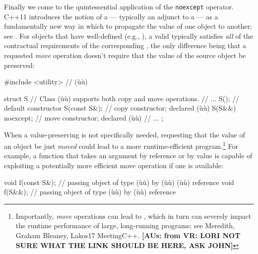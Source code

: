 Finally we come to the quintessential application of the
\lstinline!noexcept! operator. C++11 introduces the notion of a
 --- typically an adjunct to a  --- as a fundamentally new way in which to propagate the
value of one object to another; see . For objects that have well-defined  (e.g., ), a valid  typically satisfies \emph{all} of the contractual
requirements of the corresponding , the only
difference being that a requested \emph{move} operation doesn't require
that the value of the source object be preserved:

\begin{emcppshiddenlisting}[emcppsbatch={e9,e10,e11}]
#include <utility>  // (ù{}ù)
\end{emcppshiddenlisting}
\begin{emcppslisting}[emcppsbatch=e9]
struct S  // Class (ù{}ù) supports both copy and move operations.
{
   // ...
   S();              // default constructor
   S(const S&);      // copy constructor; declared (ù{}ù)
   S(S&&) noexcept;  // move constructor; declared (ù{}ù)
   // ...
};
\end{emcppslisting}
    

\noindent When a value-preserving  is not specifically
needed, requesting that the value of an object be just \emph{moved}
could lead to a more runtime-efficient program.{\cprotect\footnote{Importantly,
\emph{move} operations can lead to , which in
turn can severely impact the runtime performance of large,
long-running programs; see Meredith, Graham Bleaney, Lakos17
  MeetingC++. \textbf{[AUs: from VR: LORI NOT SURE WHAT THE LINK SHOULD BE HERE, ASK JOHN]}}} For example, a function that takes an argument by 
reference or by value is capable of exploiting a potentially more
efficient move operation if one is available:

\begin{emcppslisting}[emcppsbatch=e9]
void f(const S&);  // passing object of type (ù{}ù) by (ù{}ù) (ù{}ù) reference
void f(S&&);       // passing object of type (ù{}ù) by (ù{}ù) reference
\end{emcppslisting}
    


